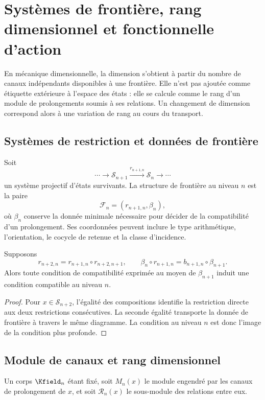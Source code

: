 \chapter{Systèmes de frontière, rang dimensionnel et fonctionnelle d'action}
\label{chap:pantalla}

En mécanique dimensionnelle, la dimension s'obtient à partir du nombre de canaux
indépendants disponibles à une frontière. Elle n'est pas ajoutée comme étiquette extérieure
à l'espace des états : elle se calcule comme le rang d'un module de prolongements
soumis à ses relations. Un changement de dimension correspond alors à une
variation de rang au cours du transport.

\section{Systèmes de restriction et données de frontière}

Soit
\[
 \cdots\longrightarrow\mathcal S_{n+1}
 \xrightarrow{r_{n+1,n}}\mathcal S_n\longrightarrow\cdots
\]
un système projectif d'états survivants. La structure de frontière au
niveau \(n\) est la paire
\[
 \mathcal F_n=(r_{n+1,n},\beta_n),
\]
où \(\beta_n\) conserve la donnée minimale nécessaire pour décider de la
compatibilité d'un prolongement. Ses coordonnées peuvent inclure le type
arithmétique, l'orientation, le cocycle de retenue et la classe d'incidence.

\begin{lemma}
Supposons
\[
 r_{n+2,n}=r_{n+1,n}\circ r_{n+2,n+1},
 \qquad
 \beta_n\circ r_{n+1,n}
 =b_{n+1,n}\circ\beta_{n+1}.
\]
Alors toute condition de compatibilité exprimée au moyen de \(\beta_{n+1}\)
induit une condition compatible au niveau \(n\).
\end{lemma}
\begin{proof}
Pour \(x\in\mathcal S_{n+2}\), l'égalité des compositions identifie la
restriction directe aux deux restrictions consécutives. La seconde
égalité transporte la donnée de frontière à travers le même diagramme. La
condition au niveau \(n\) est donc l'image de la condition plus
profonde.
\end{proof}

\section{Module de canaux et rang dimensionnel}

Un corps \(\Kfield_n\) étant fixé, soit \(M_n(x)\) le module engendré par les
canaux de prolongement de \(x\), et soit \(\mathcal R_n(x)\) le sous-module des
relations entre eux.

